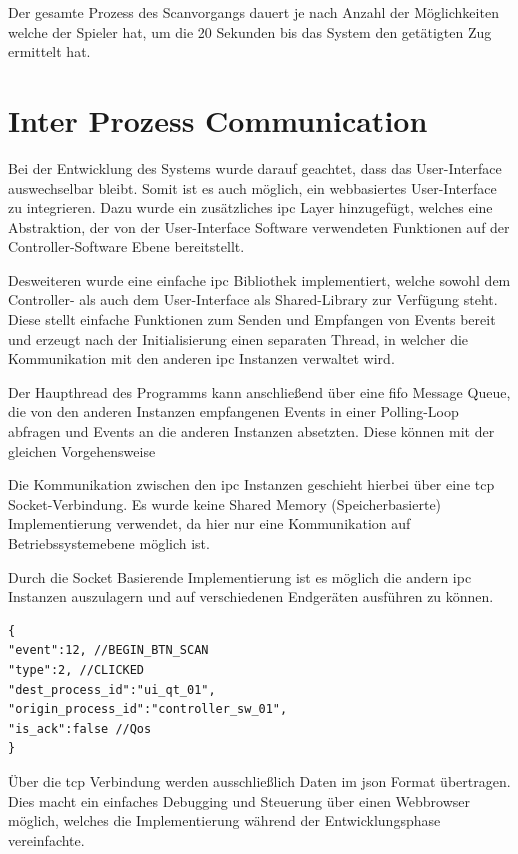 Der gesamte Prozess des Scanvorgangs dauert je nach Anzahl der
Möglichkeiten welche der Spieler hat, um die 20 Sekunden bis das System
den getätigten Zug ermittelt hat.

\hypertarget{inter-prozess-communication}{%
\section{Inter Prozess
Communication}\label{inter-prozess-communication}}

Bei der Entwicklung des Systems wurde darauf geachtet, dass das
User-Interface auswechselbar bleibt. Somit ist es auch möglich, ein
webbasiertes User-Interface zu integrieren. Dazu wurde ein zusätzliches
\gls{ipc} Layer hinzugefügt, welches eine Abstraktion, der von der
User-Interface Software verwendeten Funktionen auf der
Controller-Software Ebene bereitstellt.

Desweiteren wurde eine einfache \gls{ipc} Bibliothek implementiert,
welche sowohl dem Controller- als auch dem User-Interface als
Shared-Library zur Verfügung steht. Diese stellt einfache Funktionen zum
Senden und Empfangen von Events bereit und erzeugt nach der
Initialisierung einen separaten Thread, in welcher die Kommunikation mit
den anderen \gls{ipc} Instanzen verwaltet wird.

Der Haupthread des Programms kann anschließend über eine \gls{fifo}
Message Queue, die von den anderen Instanzen empfangenen Events in einer
Polling-Loop abfragen und Events an die anderen Instanzen absetzten.
Diese können mit der gleichen Vorgehensweise

Die Kommunikation zwischen den \gls{ipc} Instanzen geschieht hierbei
über eine \gls{tcp} Socket-Verbindung. Es wurde keine Shared Memory
(Speicherbasierte) Implementierung verwendet, da hier nur eine
Kommunikation auf Betriebssystemebene möglich ist.

Durch die Socket Basierende Implementierung ist es möglich die andern
\gls{ipc} Instanzen auszulagern und auf verschiedenen Endgeräten
ausführen zu können.

\begin{lstlisting}
{
"event":12, //BEGIN_BTN_SCAN
"type":2, //CLICKED
"dest_process_id":"ui_qt_01",
"origin_process_id":"controller_sw_01",
"is_ack":false //Qos
}
\end{lstlisting}

Über die \gls{tcp} Verbindung werden ausschließlich Daten im \gls{json}
Format übertragen. Dies macht ein einfaches Debugging und Steuerung über
einen Webbrowser möglich, welches die Implementierung während der
Entwicklungsphase vereinfachte.

